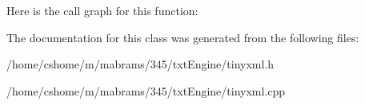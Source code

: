 \-Here is the call graph for this function\-:




\-The documentation for this class was generated from the following files\-:\begin{DoxyCompactItemize}
\item 
/home/cshome/m/mabrams/345/txt\-Engine/tinyxml.\-h\item 
/home/cshome/m/mabrams/345/txt\-Engine/tinyxml.\-cpp\end{DoxyCompactItemize}
